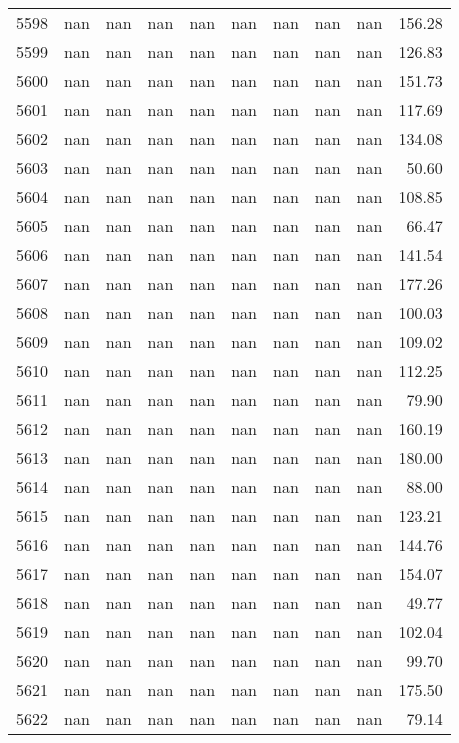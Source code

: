 \begin{tabular}{lrrrrrrrrr}
5598 & nan & nan & nan & nan & nan & nan & nan & nan & 156.28 \\
5599 & nan & nan & nan & nan & nan & nan & nan & nan & 126.83 \\
5600 & nan & nan & nan & nan & nan & nan & nan & nan & 151.73 \\
5601 & nan & nan & nan & nan & nan & nan & nan & nan & 117.69 \\
5602 & nan & nan & nan & nan & nan & nan & nan & nan & 134.08 \\
5603 & nan & nan & nan & nan & nan & nan & nan & nan & 50.60 \\
5604 & nan & nan & nan & nan & nan & nan & nan & nan & 108.85 \\
5605 & nan & nan & nan & nan & nan & nan & nan & nan & 66.47 \\
5606 & nan & nan & nan & nan & nan & nan & nan & nan & 141.54 \\
5607 & nan & nan & nan & nan & nan & nan & nan & nan & 177.26 \\
5608 & nan & nan & nan & nan & nan & nan & nan & nan & 100.03 \\
5609 & nan & nan & nan & nan & nan & nan & nan & nan & 109.02 \\
5610 & nan & nan & nan & nan & nan & nan & nan & nan & 112.25 \\
5611 & nan & nan & nan & nan & nan & nan & nan & nan & 79.90 \\
5612 & nan & nan & nan & nan & nan & nan & nan & nan & 160.19 \\
5613 & nan & nan & nan & nan & nan & nan & nan & nan & 180.00 \\
5614 & nan & nan & nan & nan & nan & nan & nan & nan & 88.00 \\
5615 & nan & nan & nan & nan & nan & nan & nan & nan & 123.21 \\
5616 & nan & nan & nan & nan & nan & nan & nan & nan & 144.76 \\
5617 & nan & nan & nan & nan & nan & nan & nan & nan & 154.07 \\
5618 & nan & nan & nan & nan & nan & nan & nan & nan & 49.77 \\
5619 & nan & nan & nan & nan & nan & nan & nan & nan & 102.04 \\
5620 & nan & nan & nan & nan & nan & nan & nan & nan & 99.70 \\
5621 & nan & nan & nan & nan & nan & nan & nan & nan & 175.50 \\
5622 & nan & nan & nan & nan & nan & nan & nan & nan & 79.14 \\

\end{tabular}
